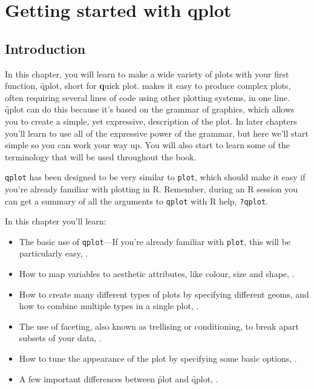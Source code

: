 

% 

% 


\chapter{Getting started with qplot}
\label{cha:qplot}

\section{Introduction} 

In this chapter, you will learn to make a wide variety of plots with your first \ggplot function, \f{qplot}, short for {\bf q}uick plot.  makes it easy to produce complex plots, often requiring several lines of code using other plotting systems, in one line. \f{qplot} can do this because it's based on the grammar of graphics, which allows you to create a simple, yet expressive, description of the plot.  In later chapters you'll learn to use all of the expressive power of the grammar, but here we'll start simple so you can work your way up.  You will also start to learn some of the \ggplot terminology that will be used throughout the book.

{\tt qplot} has been designed to be very similar to {\tt plot}, which should make it easy if you're already familiar with plotting in R.  Remember, during an R session you can get a summary of all the arguments to {\tt qplot} with R help, {\tt ?qplot}.

In this chapter you'll learn:

\begin{itemize}
  \item The basic use of {\tt qplot}---If you're already familiar with {\tt plot}, this will be particularly easy, .
  \item How to map variables to aesthetic attributes, like colour, size and shape, .
  \item How to create many different types of plots by specifying different geoms, and how to combine multiple types in a single plot,  .
  \item The use of faceting, also known as trellising or conditioning, to break apart subsets of your data, .
  \item How to tune the appearance of the plot by specifying some basic options, .
  \item A few important differences between \f{plot} and \f{qplot}, .
\end{itemize}

